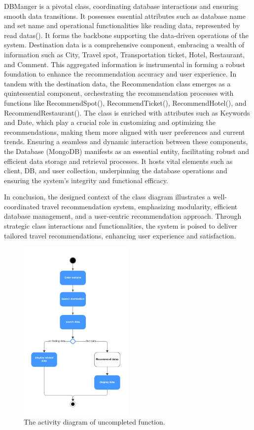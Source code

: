 \documentclass[conference]{IEEEtran}
\begin{document}
DBManger is a pivotal class, coordinating database interactions and ensuring smooth data transitions. It possesses essential attributes such as database name and set name and operational functionalities like reading data, represented by read datas(). It forms the backbone supporting the data-driven operations of the system. Destination data is a comprehensive component, embracing a wealth of information such as City, Travel spot, Transportation ticket, Hotel, Restaurant, and Comment. This aggregated information is instrumental in forming a robust foundation to enhance the recommendation accuracy and user experience. In tandem with the destination data, the Recommendation class emerges as a quintessential component, orchestrating the recommendation processes with functions like RecommendSpot(), RecommendTicket(), RecommendHotel(), and RecommendRestaurant(). The class is enriched with attributes such as Keywords and Date, which play a crucial role in customizing and optimizing the recommendations, making them more aligned with user preferences and current trends. Ensuring a seamless and dynamic interaction between these components, the Database (MongoDB) manifests as an essential entity, facilitating robust and efficient data storage and retrieval processes. It hosts vital elements such as client, DB, and user collection, underpinning the database operations and ensuring the system’s integrity and functional efficacy.

In conclusion, the designed context of the class diagram illustrates a well-coordinated travel recommendation system, emphasizing modularity, efficient database management, and a user-centric recommendation approach. Through strategic class interactions and functionalities, the system is poised to deliver tailored travel recommendations, enhancing user experience and satisfaction.

\begin{figure}[htbp]
	\centerline{\includegraphics[width=0.5\textwidth]{uncompleted/activity_uncompleted.pdf}}
	\caption{The activity diagram of uncompleted function. }
	\label{uncompleted2}
\end{figure}
\end{document}

